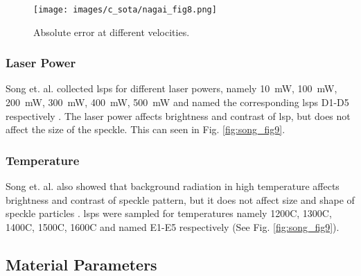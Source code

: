 
    \begin{figure}[h]
        \centering
        \texttt{[image: images/c\_sota/nagai\_fig8.png]}
        \caption{Absolute error at different velocities. \cite{nagai}}
        \label{fig:nagai_fig8}
    \end{figure}
    

    \subsubsection*{Laser Power}
    Song et. al. collected \glspl{lsp} for different laser powers, namely \SI{10}{\milli\watt}, \SI{100}{\milli\watt}, \SI{200}{\milli\watt}, \SI{300}{\milli\watt}, \SI{400}{\milli\watt}, \SI{500}{\milli\watt} and named the corresponding \glspl{lsp} D1-D5 respectively \cite{song}. The laser power affects brightness and contrast of \gls{lsp}, but does not affect the size of the speckle. This can seen in Fig. \ref{fig:song_fig9}.


    \subsubsection*{Temperature}
    Song et. al. also showed that background radiation in high temperature affects brightness and contrast of speckle pattern, but it does not affect size and shape of speckle particles \cite{song}. \glspl{lsp} were sampled for temperatures namely 1200\textdegree{}C, 1300\textdegree{}C, 1400\textdegree{}C, 1500\textdegree{}C, 1600\textdegree{}C and named E1-E5 respectively (See Fig. \ref{fig:song_fig9}).


\vspace{5mm}
\subsection{Material Parameters}

